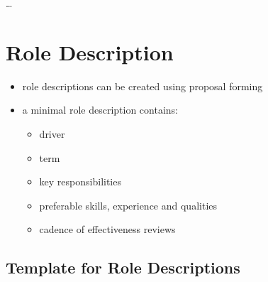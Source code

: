 {\ldots}

\section{Role Description}
\label{roledescription}

\begin{itemize}
\item role descriptions can be created using proposal forming

\item a minimal role description contains:

\begin{itemize}
\item driver

\item term

\item key responsibilities

\item preferable skills, experience and qualities

\item cadence of effectiveness reviews

\end{itemize}

\end{itemize}

\subsection{Template for Role Descriptions}
\label{templateforroledescriptions}


